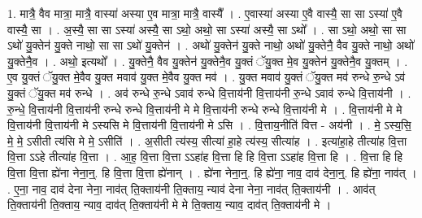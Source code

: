 \documentclass[17pt]{extarticle}
\begin{document}
1. मात्रै॒ वैव मात्रा॒ मात्रै॒ वास्या॑ अस्या ए॒व मात्रा॒ मात्रै॒ वास्यै᳚ । . ए॒वास्या॑ अस्या ए॒वै वास्यै॒ सा सा ऽस्या॑ ए॒वै वास्यै॒ सा । . अ॒स्यै॒ सा सा ऽस्या॑ अस्यै॒ सा ऽथो॒ अथो॒ सा ऽस्या॑ अस्यै॒ सा ऽथो᳚ । . सा ऽथो॒ अथो॒ सा सा ऽथो॑ यु॒क्तेन॑ यु॒क्ते नाथो॒ सा सा ऽथो॑ यु॒क्तेन॑ । . अथो॑ यु॒क्तेन॑ यु॒क्ते नाथो॒ अथो॑ यु॒क्तेनै॒ वैव यु॒क्ते नाथो॒ अथो॑ यु॒क्तेनै॒व । . अथो॒ इत्यथो᳚ । . यु॒क्तेनै॒ वैव यु॒क्तेन॑ यु॒क्तेनै॒व यु॒क्तं ॅयु॒क्त मे॒व यु॒क्तेन॑ यु॒क्तेनै॒व यु॒क्तम् । . ए॒व यु॒क्तं ॅयु॒क्त मे॒वैव यु॒क्त मवाव॑ यु॒क्त मे॒वैव यु॒क्त मव॑ । . यु॒क्त मवाव॑ यु॒क्तं ॅयु॒क्त मव॑ रुन्धे रु॒न्धे ऽव॑ यु॒क्तं ॅयु॒क्त मव॑ रुन्धे । . अव॑ रुन्धे रु॒न्धे ऽवाव॑ रुन्धे वि॒त्ताय॑नी वि॒त्ताय॑नी रु॒न्धे ऽवाव॑ रुन्धे वि॒त्ताय॑नी । . रु॒न्धे॒ वि॒त्ताय॑नी वि॒त्ताय॑नी रुन्धे रुन्धे वि॒त्ताय॑नी मे मे वि॒त्ताय॑नी रुन्धे रुन्धे वि॒त्ताय॑नी मे । . वि॒त्ताय॑नी मे मे वि॒त्ताय॑नी वि॒त्ताय॑नी मे ऽस्यसि मे वि॒त्ताय॑नी वि॒त्ताय॑नी मे ऽसि । . वि॒त्ताय॒नीति॑ वित्त - अय॑नी । . मे॒ ऽस्य॒सि॒ मे॒ मे॒ ऽसीती त्य॑सि मे मे॒ ऽसीति॑ । . अ॒सीती त्य॑स्य॒ सीत्या॑ हा॒हे त्य॑स्य॒ सीत्या॑ह । . इत्या॑हा॒हे तीत्या॑ह वि॒त्ता वि॒त्ता ऽऽहे तीत्या॑ह वि॒त्ता । . आ॒ह॒ वि॒त्ता वि॒त्ता ऽऽहा॑ह वि॒त्ता हि हि वि॒त्ता ऽऽहा॑ह वि॒त्ता हि । . वि॒त्ता हि हि वि॒त्ता वि॒त्ता ह्ये॑ना नेना॒न्॒. हि वि॒त्ता वि॒त्ता ह्ये॑नान् । . ह्ये॑ना नेना॒न्॒. हि ह्ये॑ना॒ नाव॒ दाव॑ देना॒न्॒. हि ह्ये॑ना॒ नाव॑त् । . ए॒ना॒ नाव॒ दाव॑ देना नेना॒ नाव॑त् ति॒क्ताय॑नी ति॒क्ताय॒ न्याव॑ देना नेना॒ नाव॑त् ति॒क्ताय॑नी । . आव॑त् ति॒क्ताय॑नी ति॒क्ताय॒ न्याव॒ दाव॑त् ति॒क्ताय॑नी मे मे ति॒क्ताय॒ न्याव॒ दाव॑त् ति॒क्ताय॑नी मे । \newline
\end{document}
